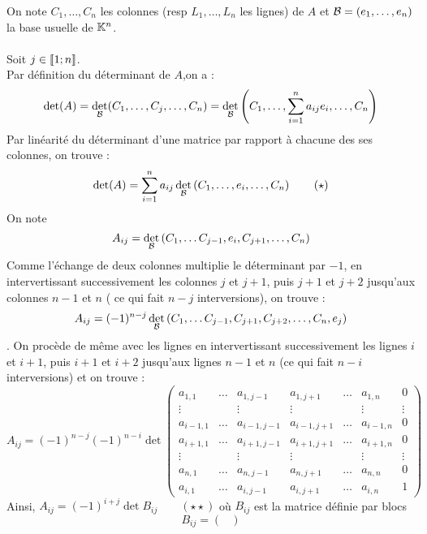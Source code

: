 \begin{dem}
    On note \(C_1, \dots , C_n\) les colonnes (resp \(L_1, \dots , L_n\) les lignes) de \(A\) et \(\cal{B} = (e_1, \dots , e_n)\) la base usuelle de \(\K^n\).\\~\\
    Soit \(j \in \interventierii{1}{n}\).\\
    Par définition du déterminant de \(A\),on a :
    \[\det (A) = \det_{\cal{B}} (C_1, \dots , C_j , \dots , C_n) = \det_{\cal{B}}\paren{ C_1, \dots , \sum^n_{i=1} a_{ij} e_i, \dots , C_n}\]
    Par linéarité du déterminant d’une matrice par rapport à chacune des ses colonnes, on trouve :
    \[\det (A) = \sum^n_{i=1} a_{ij} \det_{\cal{B}} \paren{C_1, \dots , e_i, \dots , C_n} \qquad(\star)\]
    On note
    \[A_{ij} = \det_{\cal{B}} \paren{C_1, \dots C_{j-1}, e_i, C_{j+1}, \dots , C_n} \]
    Comme l’échange de deux colonnes multiplie le déterminant par \(-1\), en intervertissant successivement les colonnes \(j\) et \(j + 1\), puis \(j + 1\) et \(j + 2\) jusqu’aux colonnes \(n - 1\) et \(n\) ( ce qui fait \(n - j\) interversions), on trouve :
    \[A_{ij} = (-1)^{n-j} \det_{\cal{B}} \paren{C_1, \dots C_{j-1}, C_{j+1}, C_{j+2}, \dots , C_n, e_j } \].
    On procède de même avec les lignes en intervertissant successivement les lignes \(i\) et \(i + 1\), puis \(i + 1\) et \(i + 2\) jusqu’aux lignes \(n - 1\) et \(n\) (ce qui fait \(n - i\) interversions) et on trouve :
    \[A_{ij} = (-1)^{n-j} (-1)^{n-i} \det 
    \begin{pmatrix}
    a_{1,1}   & \dots & a_{1,j-1}   & a_{1,j+1}   & \dots & a_{1,n}  & 0      \\
    \vdots    &       & \vdots      & \vdots      &       & \vdots   & \vdots \\
    a_{i-1,1} & \dots & a_{i-1,j-1} & a_{i-1,j+1} & \dots & a_{i-1,n}& 0      \\
    a_{i+1,1} & \dots & a_{i+1,j-1} & a_{i+1,j+1} & \dots & a_{i+1,n}& 0      \\
    \vdots    &       & \vdots      & \vdots      &       & \vdots   & \vdots \\
    a_{n,1}   & \dots & a_{n,j-1}   & a_{n,j+1}   & \dots & a_{n,n}  & 0      \\
    a_{i,1}   & \dots & a_{i,j-1}   & a_{i,j+1}   & \dots & a_{i,n}  & 1 
    \end{pmatrix}
    \]
    Ainsi, \(A_{ij} = (-1)^{i+j} \det B_{ij}  \qquad (\star\star)\) où \(B_{ij}\) est la matrice définie par blocs
    \[B_{ij} =\begin{pmatrix}

\end{pmatrix}\]
\end{dem}
